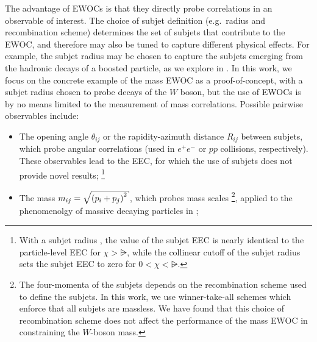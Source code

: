 The advantage of EWOCs is that they directly probe correlations in an observable of interest.
%
The choice of subjet definition (e.g.~radius and recombination scheme) determines the set of subjets that contribute to the EWOC, and therefore may also be tuned to capture different physical effects.
%
For example, the subjet radius may be chosen to capture the subjets emerging from the hadronic decays of a boosted particle, as we explore in .
%
In this work, we focus on the concrete example of the mass EWOC as a proof-of-concept, with a subjet radius chosen to probe decays of the \(W\) boson, but the use of EWOCs is by no means limited to the measurement of mass correlations.
%
Possible pairwise observables include:
\begin{itemize}
    \item
        The opening angle \(\theta_{ij}\) or the rapidity-azimuth distance \(R_{ij}\) between subjets, which probe angular correlations (used in $e^+e^-$ or $pp$ collisions, respectively).
        These observables lead to the EEC, for which the use of subjets does not provide novel results;%
        \footnote{
            With a subjet radius \rsub{}, the value of the subjet EEC is nearly identical to the particle-level EEC for $\chi>\rsub$, while the collinear cutoff of the subjet radius sets the subjet EEC to zero for $0<\chi<\rsub$.
        }

    \item
        The mass \(m_{ij} = \sqrt{\le(p_i + p_j\ri)^2}\), which probes mass scales%
        \footnote{
            The four-momenta of the subjets depends on the recombination scheme used to define the subjets.
            In this work, we use winner-take-all schemes which enforce that all subjets are massless.
            We have found that this choice of recombination scheme does not affect the performance of the mass EWOC in constraining the $W$-boson mass.
        }, applied to the phenomenolgy of massive decaying particles in ;


\end{itemize}
